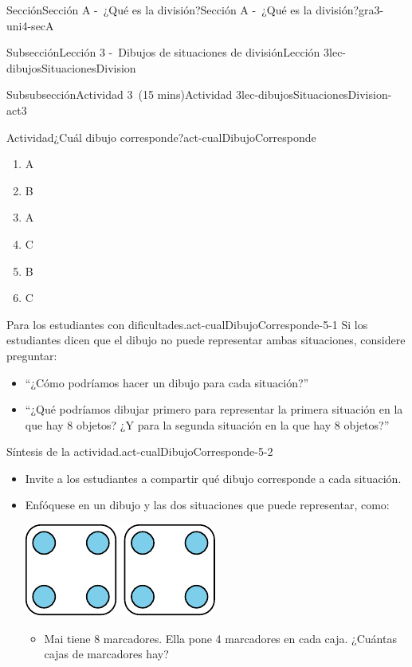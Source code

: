 \documentclass[oneside,10pt,]{article}
\begin{document}
\begin{sectionptx}{Sección}{Sección A -~¿Qué es la división?}{}{Sección A -~¿Qué es la división?}{}{}{gra3-uni4-secA}
\begin{subsectionptx}{Subsección}{Lección 3 -~Dibujos de situaciones de división}{}{Lección 3}{}{}{lec-dibujosSituacionesDivision}
\begin{subsubsectionptx}{Subsubsección}{Actividad 3~(15 mins)}{}{Actividad 3}{}{}{lec-dibujosSituacionesDivision-act3}
\begin{activity}{Actividad}{¿Cuál dibujo corresponde?}{act-cualDibujoCorresponde}
%
\begin{enumerate}
\item{}A%
\item{}B%
\item{}A%
\item{}C%
\item{}B%
\item{}C%
\end{enumerate}
\end{activity}%
\par
\begin{paragraphs}{Para los estudiantes con dificultades.}{act-cualDibujoCorresponde-5-1}%
Si los estudiantes dicen que el dibujo no puede representar ambas situaciones, considere preguntar:%
%
\begin{itemize}[label=\textbullet]
\item{}``¿Cómo podríamos hacer un dibujo para cada situación?''%
\item{}``¿Qué podríamos dibujar primero para representar la primera situación en la que hay 8 objetos? ¿Y para la segunda situación en la que hay 8 objetos?''%
\end{itemize}
\end{paragraphs}%
\begin{paragraphs}{Síntesis de la actividad.}{act-cualDibujoCorresponde-5-2}%
%
\begin{itemize}[label=\textbullet]
\item{}Invite a los estudiantes a compartir qué dibujo corresponde a cada situación.%
\item{}Enfóquese en un dibujo y las dos situaciones que puede representar, como:%
\begin{image}{0}{1}{0}{}%
\includegraphics[width=\linewidth]{external/svg-source/tikz-file-149312.pdf}
\end{image}%
%
\begin{itemize}[label=$\circ$]
\item{}Mai tiene 8 marcadores. Ella pone 4 marcadores en cada caja. ¿Cuántas cajas de marcadores hay?%

\end{itemize}
\end{itemize}
\end{paragraphs}
\end{subsubsectionptx}
\end{subsectionptx}
\end{sectionptx}
\end{document}
